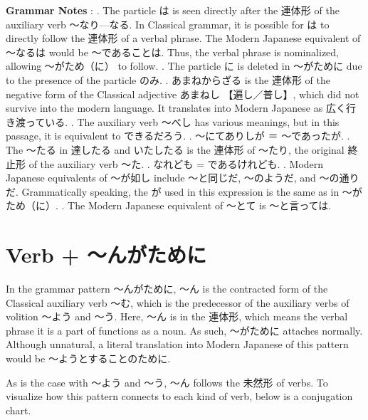 \par{\textbf{Grammar Notes }: \hfill{}. The particle は is seen directly after the 連体形 of the auxiliary verb ～なり—なる. In Classical grammar, it is possible for は to directly follow the 連体形 of a verbal phrase. The Modern Japanese equivalent of ～なるは would be ～であることは. Thus, the verbal phrase is nominalized, allowing ～がため（に） to follow. \hfill{}. The particle に is deleted in ～がために due to the presence of the particle のみ. \hfill{}. あまねからざる is the 連体形 of the negative form of the Classical adjective あまねし 【遍し／普し】, which did not survive into the modern language. It translates into Modern Japanese as 広く行き渡っている. \hfill{}. The auxiliary verb ～べし has various meanings, but in this passage, it is equivalent to できるだろう. \hfill{}. ～にてありしが ＝ ～であったが. \hfill{}. The ～たる in 達したる and いたしたる is the 連体形 of ～たり, the original 終止形 of the auxiliary verb ～た. \hfill{}. なれども = であるけれども. \hfill{}. Modern Japanese equivalents of ～が如し include ～と同じだ, ～のようだ, and ～の通りだ. Grammatically speaking, the が used in this expression is the same as in ～がため（に）. \hfill{}. The Modern Japanese equivalent of ～とて is ～と言っては. }
      
\section{Verb + ～んがために}
 
\par{ In the grammar pattern ～んがために, ～ん is the contracted form of the Classical auxiliary verb ～む, which is the predecessor of the auxiliary verbs of volition ～よう and ～う. Here, ～ん is in the 連体形, which means the verbal phrase it is a part of functions as a noun. As such, ～がために attaches normally. Although unnatural, a literal translation into Modern Japanese of this pattern would be ～ようとすることのために. }

\par{ As is the case with ～よう and ～う, ～ん follows the 未然形 of verbs. To visualize how this pattern connects to each kind of verb, below is a conjugation chart. }

